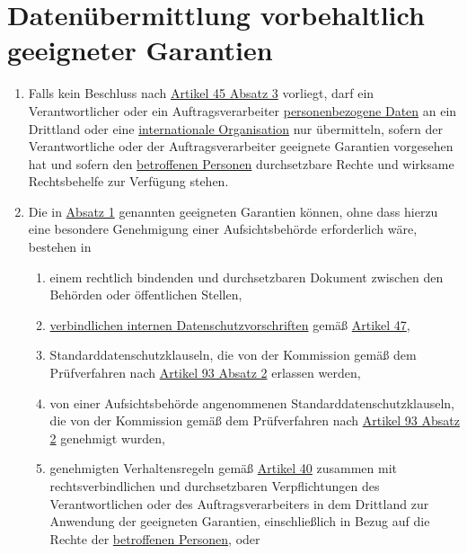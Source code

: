 \chapter{Datenübermittlung vorbehaltlich geeigneter Garantien}
\label{ch:46}


\begin{enumerate}

  \item Falls kein Beschluss nach \hyperref[itm:45-3]{Artikel 45 Absatz 3} vorliegt, darf ein Verantwortlicher oder ein
   Auftragsverarbeiter \hyperref[itm:04-1]{personenbezogene Daten} an ein Drittland oder eine \hyperref[itm:04-29]{internationale Organisation} nur übermitteln,
   sofern der Verantwortliche oder der Auftragsverarbeiter geeignete Garantien vorgesehen hat und sofern den
   \hyperref[itm:04-1]{betroffenen Personen} durchsetzbare Rechte und wirksame Rechtsbehelfe zur Verfügung stehen.
  \label{itm:46-1}

  \item Die in \hyperref[itm:46-1]{Absatz 1} genannten geeigneten Garantien können, ohne dass hierzu eine besondere
   Genehmigung einer Aufsichtsbehörde erforderlich wäre, bestehen in
  \label{itm:46-2}

  \begin{enumerate}
  
    \item einem rechtlich bindenden und durchsetzbaren Dokument zwischen den Behörden oder öffentlichen Stellen,
    \label{itm:46-2a}

    \item \hyperref[itm:04-20]{verbindlichen internen Datenschutzvorschriften} gemäß \hyperref[ch:47]{Artikel 47},
    \label{itm:46-2b}

    \item Standarddatenschutzklauseln, die von der Kommission gemäß dem Prüfverfahren nach \hyperref[itm:93-2]
     {Artikel 93 Absatz 2} erlassen werden,
    \label{itm:46-2c}

    \item von einer Aufsichtsbehörde angenommenen Standarddatenschutzklauseln, die von der Kommission gemäß dem
     Prüfverfahren nach \hyperref[itm:93-2]{Artikel 93 Absatz 2} genehmigt wurden,
    \label{itm:46-2d}

    \item genehmigten Verhaltensregeln gemäß \hyperref[ch:40]{Artikel 40} zusammen mit rechtsverbindlichen und
     durchsetzbaren Verpflichtungen des Verantwortlichen oder des Auftragsverarbeiters in dem Drittland zur Anwendung
     der geeigneten Garantien, einschließlich in Bezug auf die Rechte der \hyperref[itm:04-1]{betroffenen Personen}, oder
    \label{itm:46-2e}


\end{enumerate}
\end{enumerate}
